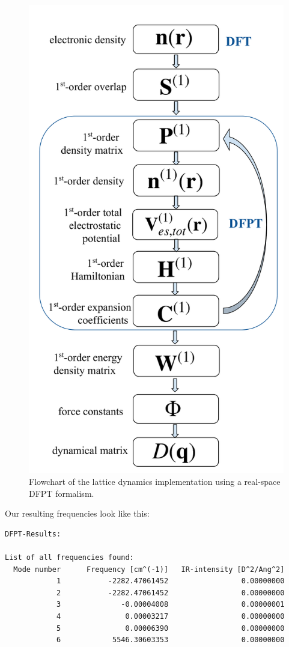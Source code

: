 \begin{figure}
\includegraphics[width=0.7\columnwidth]{DFPT_lattice_dynamics_flowchart}
\caption{Flowchart of the lattice dynamics implementation using a real-space DFPT formalism.}
\label{fig:DFPT_lattice_dynamics_flowchart}
\end{figure}




Our resulting frequencies look like this:
{\footnotesize
\begin{verbatim}
DFPT-Results:

List of all frequencies found:
  Mode number      Frequency [cm^(-1)]   IR-intensity [D^2/Ang^2]
            1           -2282.47061452                 0.00000000
            2           -2282.47061452                 0.00000000
            3              -0.00004008                 0.00000001
            4               0.00003217                 0.00000000
            5               0.00006390                 0.00000000
            6            5546.30603353                 0.00000000
\end{verbatim}
}


